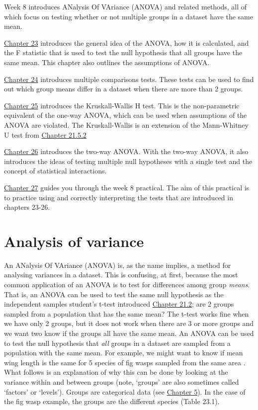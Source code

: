 \documentclass[
]{scrbook}
\begin{document}
Week 8 introduces ANalysis Of VAriance (ANOVA) and related methods, all of which focus on testing whether or not multiple groups in a dataset have the same mean.

\protect\hyperlink{Chapter_23}{Chapter 23} introduces the general idea of the ANOVA, how it is calculated, and the F statistic that is used to test the null hypothesis that all groups have the same mean.
This chapter also outlines the assumptions of ANOVA.

\protect\hyperlink{Chapter_24}{Chapter 24} introduces multiple comparisons tests.
These tests can be used to find out which group means differ in a dataset when there are more than 2 groups.

\protect\hyperlink{Chapter_25}{Chapter 25} introduces the Kruskall-Wallis H test.
This is the non-parametric equivalent of the one-way ANOVA, which can be used when assumptions of the ANOVA are violated.
The Kruskall-Wallis is an extension of the Mann-Whitney U test from \protect\hyperlink{mann-whitney-u-test}{Chapter 21.5.2}

\protect\hyperlink{Chapter_25}{Chapter 26} introduces the two-way ANOVA.
With the two-way ANOVA, it also introduces the ideas of testing multiple null hypotheses with a single test and the concept of statistical interactions.

\protect\hyperlink{Chapter_25}{Chapter 27} guides you through the week 8 practical. The aim of this practical is to practice using and correctly interpreting the tests that are introduced in chapters 23-26.

\hypertarget{Chapter_23}{%
\chapter{Analysis of variance}\label{Chapter_23}}

An ANalysis Of VAriance (ANOVA) is, as the name implies, a method for analysing variances in a dataset.
This is confusing, at first, because the most common application of an ANOVA is to test for differences among group \emph{means}.
That is, an ANOVA can be used to test the same null hypothesis as the independent samples student's t-test introduced \protect\hyperlink{independent-samples-t-test}{Chapter 21.2}; are 2 groups sampled from a population that has the same mean?
The t-test works fine when we have only 2 groups, but it does not work when there are 3 or more groups and we want two know if the groups all have the same mean.
An ANOVA can be used to test the null hypothesis that \emph{all} groups in a dataset are sampled from a population with the same mean.
For example, we might want to know if mean wing length is the same for 5 species of fig wasps sampled from the same area \citep{Duthie2015b}.
What follows is an explanation of why this can be done by looking at the variance within and between groups (note, `groups' are also sometimes called `factors' or `levels').
Groups are categorical data (see \protect\hyperlink{Chapter_5}{Chapter 5}).
In the case of the fig wasp example, the groups are the different species (Table 23.1).
\end{document}
